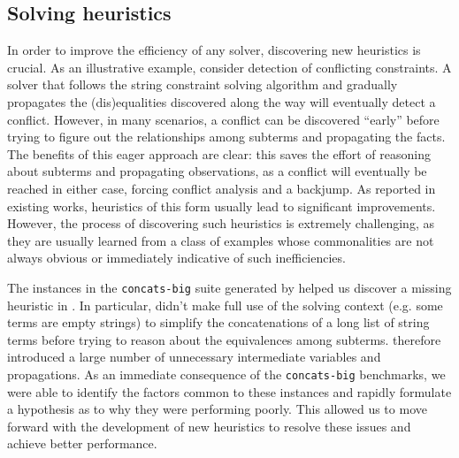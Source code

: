     

\subsection{Solving heuristics}


In order to improve the efficiency of any solver, discovering new heuristics is crucial.
As an illustrative example, consider detection of conflicting constraints.
A solver that follows the string constraint solving algorithm and gradually propagates
the (dis)equalities discovered along the way will eventually detect a conflict.
However, in many scenarios, a conflict can be discovered ``early'' before trying to
figure out the relationships among subterms and propagating the facts.
The benefits of this eager approach are clear: this saves the effort of reasoning about
subterms and propagating observations, as a conflict will eventually be reached in either case,
forcing conflict analysis and a backjump.
As reported in existing works, heuristics of this form usually lead to significant improvements.
However, the process of discovering such heuristics is extremely challenging,
as they are usually learned from a class of examples whose commonalities
are not always obvious or immediately indicative of such inefficiencies.

The instances in the \texttt{concats-big} suite generated by \fuzzer{} helped us 
discover a missing heuristic in \us{}. In particular, \us{} didn't make full use 
of the solving context (e.g. some terms are empty strings) to simplify the 
concatenations of a long list of string terms before trying to reason about the 
equivalences among subterms. \us{} therefore introduced a large number of unnecessary
intermediate variables and propagations.
As an immediate consequence of the \texttt{concats-big} benchmarks, we were able to identify
the factors common to these instances and rapidly formulate a hypothesis as to why they were
performing poorly. This allowed us to move forward with the development of new heuristics
to resolve these issues and achieve better performance.




        
        
        



